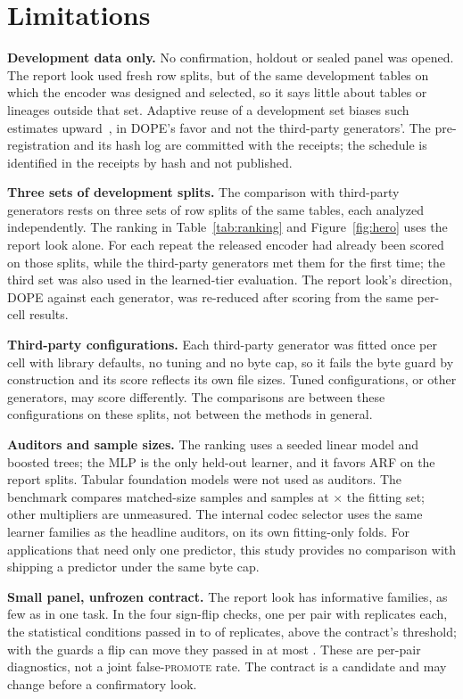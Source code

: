 \documentclass[10pt,letterpaper,twocolumn]{article}
\newcommand{\runin}[1]{\par\smallskip\noindent\textbf{#1.}\hspace{0.45em}\ignorespaces}
\newcommand{\x}{\ensuremath{\times}}
\begin{document}
\section{Limitations}\label{sec:limits}
\runin{Development data only} No confirmation, holdout or sealed panel was opened. The report look used fresh row splits, but of the same development tables on which the encoder was designed and selected, so it says little about tables or lineages outside that set. Adaptive reuse of a development set biases such estimates upward~\cite{dwork2015reusable}, in DOPE's favor and not the third-party generators'. The pre-registration and its hash log are committed with the receipts; the schedule is identified in the receipts by hash and not published.

\runin{Three sets of development splits} The comparison with third-party generators rests on three sets of row splits of the same tables, each analyzed independently. The ranking in Table~\ref{tab:ranking} and Figure~\ref{fig:hero} uses the report look alone. For each repeat the released encoder had already been scored on those splits, while the third-party generators met them for the first time; the third set was also used in the learned-tier evaluation. The report look's direction, DOPE against each generator, was re-reduced after scoring from the same per-cell results.

\runin{Third-party configurations} Each third-party generator was fitted once per cell with library defaults, no tuning and no byte cap, so it fails the byte guard by construction and its score reflects its own file sizes. Tuned configurations, or other generators, may score differently. The comparisons are between these configurations on these splits, not between the methods in general.

\runin{Auditors and sample sizes} The ranking uses a seeded linear model and boosted trees; the MLP is the only held-out learner, and it favors ARF on the report splits. Tabular foundation models were not used as auditors. The benchmark compares matched-size samples and samples at \x{} the fitting set; other multipliers are unmeasured. The internal codec selector uses the same learner families as the headline auditors, on its own fitting-only folds. For applications that need only one predictor, this study provides no comparison with shipping a predictor under the same byte cap.

\runin{Small panel, unfrozen contract} The report look has  informative families, as few as  in one task. In the four sign-flip checks, one per pair with  replicates each, the statistical conditions passed in  to  of replicates, above the contract's  threshold; with the guards a flip can move they passed in at most . These are per-pair diagnostics, not a joint false-\textsc{promote} rate. The contract is a candidate and may change before a confirmatory look.
\end{document}
